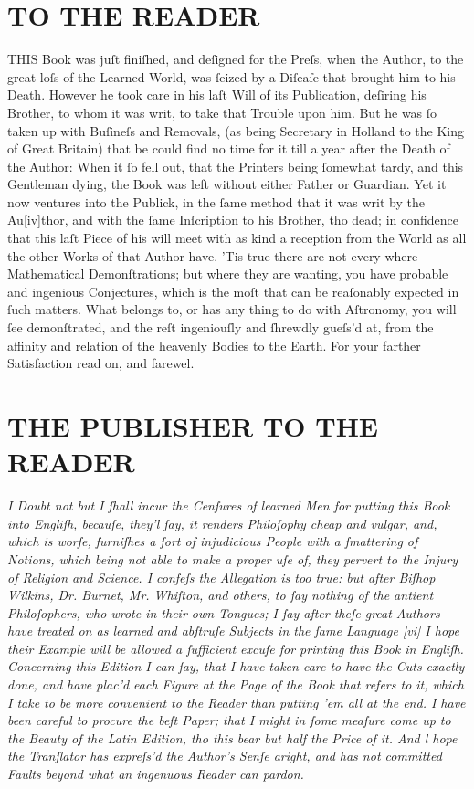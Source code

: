 \documentclass[letterpaper]{book}
\begin{document}
\chapter{TO THE READER} %
\label{ſec:TO THE READER}
THIS Book was juſt finiſhed, and deſigned for the Preſs, when the Author,
to the great loſs of the Learned World, was ſeized by a Diſeaſe that brought
him to his Death. However he took care in his laſt Will of its Publication,
deſiring his Brother, to whom it was writ, to take that Trouble upon him.
But he was ſo taken up with Buſineſs and Removals, (as being Secretary in
Holland to the King of Great Britain) that be could find no time for it till
a year after the Death of the Author: When it ſo fell out, that the Printers
being ſomewhat tardy, and this Gentleman dying, the Book was left without
either Father or Guardian. Yet it now ventures into the Publick, in the ſame
method that it was writ by the Au[iv]thor, and with the ſame Inſcription to
his Brother, tho dead; in confidence that this laſt Piece of his will meet with
as kind a reception from the World as all the other Works of that Author
have. 'Tis true there are not every where Mathematical Demonſtrations; but
where they are wanting, you have probable and ingenious Conjectures, which
is the moſt that can be reaſonably expected in ſuch matters. What belongs
to, or has any thing to do with Aſtronomy, you will ſee demonſtrated, and
the reſt ingeniouſly and ſhrewdly gueſs'd at, from the affinity and relation
of the heavenly Bodies to the Earth. For your farther Satisfaction read on,
and farewel.

\chapter{THE PUBLISHER TO THE READER} 

\emph{ I Doubt not but I ſhall incur the Cenſures of learned Men for putting
this Book into Engliſh, becauſe, they'l ſay, it renders Philoſophy cheap and
vulgar, and, which is worſe, furniſhes a ſort of injudicious People with a
ſmattering of Notions, which being not able to make a proper uſe of, they
pervert to the Injury of Religion and Science. I confeſs the Allegation is
too true: but after Biſhop Wilkins, Dr. Burnet, Mr. Whiſton, and others, to
ſay nothing of the antient Philoſophers, who wrote in their own Tongues; I
ſay after theſe great Authors have treated on as learned and abſtruſe
Subjects in the ſame Language [vi] I hope their Example will be allowed a
ſufficient excuſe for printing this Book in Engliſh.  Concerning this
Edition I can ſay, that I have taken care to have the Cuts exactly done, and
have plac'd each Figure at the Page of the Book that refers to it, which I
take to be more convenient to the Reader than putting 'em all at the end.  I
have been careful to procure the beſt Paper; that I might in ſome meaſure
come up to the Beauty of the Latin Edition, tho this bear but half the Price
of it.  And l hope the Tranſlator has expreſs'd the Author's Senſe aright,
and has not committed Faults beyond what an ingenuous Reader can pardon.}
\end{document}
